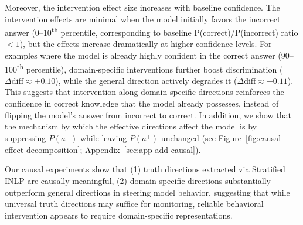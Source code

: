 \documentclass{article}
\theoremstyle{plain}
\theoremstyle{definition}
\theoremstyle{remark}
\begin{document}

Moreover, the intervention effect size increases with baseline confidence. The intervention effects are minimal when the model initially favors the incorrect answer (0--10\textsuperscript{th} percentile, corresponding to baseline P(correct)/P(incorrect) ratio $< 1$), but the effects increase dramatically at higher confidence levels. For examples where the model is already highly confident in the correct answer (90--100\textsuperscript{th} percentile), domain-specific interventions further boost discrimination ($\Delta\text{diff} \approx +0.10$), while the general direction actively degrades it ($\Delta\text{diff} \approx -0.11$). 
This suggests that intervention along domain-specific directions reinforces the confidence in correct knowledge that the model already possesses, instead of flipping the model's answer from incorrect to correct. 
In addition, we show that the mechanism by which the effective directions affect the model is by suppressing $P(a^{-})$ while leaving $P(a^+)$ unchanged (see Figure~\ref{fig:causal-effect-decomposition}; Appendix~\ref{sec:app-add-causal}).

Our causal experiments show that (1) truth directions extracted via Stratified INLP are causally meaningful, (2) domain-specific directions substantially outperform general directions in steering model behavior, suggesting that while universal truth directions may suffice for monitoring, reliable behavioral intervention appears to require domain-specific representations.
\end{document}
